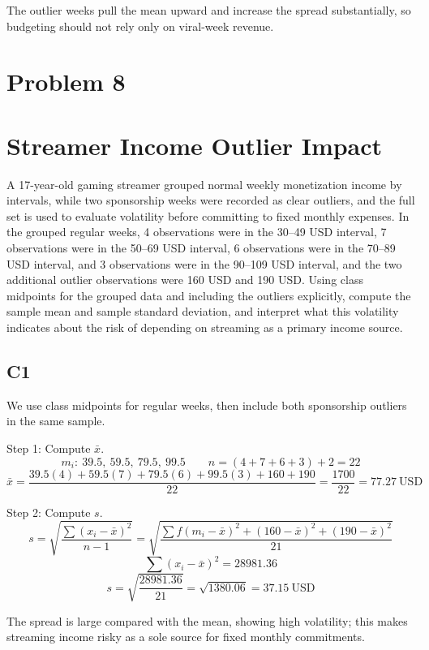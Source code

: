 \begin{ExamProblems}
		The outlier weeks pull the mean upward and increase the spread substantially, so budgeting should not rely only on viral-week revenue.

		\newpage
		\item
		\section{Problem 8}
		\section{Streamer Income Outlier Impact}
		A 17-year-old gaming streamer grouped normal weekly monetization income by intervals, while two sponsorship weeks were recorded as clear outliers, and the full set is used to evaluate volatility before committing to fixed monthly expenses. In the grouped regular weeks, 4 observations were in the 30--49 USD interval, 7 observations were in the 50--69 USD interval, 6 observations were in the 70--89 USD interval, and 3 observations were in the 90--109 USD interval, and the two additional outlier observations were 160 USD and 190 USD. Using class midpoints for the grouped data and including the outliers explicitly, compute the sample mean and sample standard deviation, and interpret what this volatility indicates about the risk of depending on streaming as a primary income source.

		\subsection*{C1}
		We use class midpoints for regular weeks, then include both sponsorship outliers in the same sample.

		Step 1: Compute $\bar{x}$.
		\[
		m_i:\ 39.5,\ 59.5,\ 79.5,\ 99.5
		\qquad
		n = (4+7+6+3)+2 = 22
		\]
		\[
		\bar{x} = \frac{39.5(4)+59.5(7)+79.5(6)+99.5(3)+160+190}{22}
		= \frac{1700}{22}
		= 77.27\ \text{USD}
		\]

		Step 2: Compute $s$.
		\[
		s = \sqrt{\frac{\sum (x_i-\bar{x})^2}{n-1}}
		= \sqrt{\frac{\sum f(m_i-\bar{x})^2 + (160-\bar{x})^2 + (190-\bar{x})^2}{21}}
		\]
		\[
		\sum (x_i-\bar{x})^2 = 28981.36
		\]
		\[
		s = \sqrt{\frac{28981.36}{21}} = \sqrt{1380.06} = 37.15\ \text{USD}
		\]

		The spread is large compared with the mean, showing high volatility; this makes streaming income risky as a sole source for fixed monthly commitments.

		\newpage
		\item

\end{ExamProblems}
